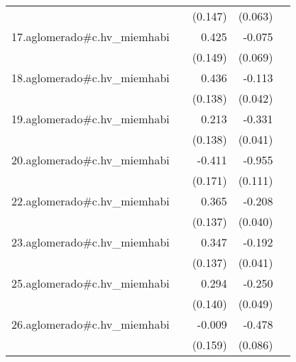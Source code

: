 {\begin{longtable}{l*{4}{D{.}{.}{-1}}}
            &                     &     (0.147)         &     (0.063)         &                     \\
\addlinespace
17.aglomerado#c.hv\_miemhabi&                     &       0.425\sym{**} &      -0.075         &                     \\
            &                     &     (0.149)         &     (0.069)         &                     \\
\addlinespace
18.aglomerado#c.hv\_miemhabi&                     &       0.436\sym{**} &      -0.113\sym{**} &                     \\
            &                     &     (0.138)         &     (0.042)         &                     \\
\addlinespace
19.aglomerado#c.hv\_miemhabi&                     &       0.213         &      -0.331\sym{***}&                     \\
            &                     &     (0.138)         &     (0.041)         &                     \\
\addlinespace
20.aglomerado#c.hv\_miemhabi&                     &      -0.411\sym{*}  &      -0.955\sym{***}&                     \\
            &                     &     (0.171)         &     (0.111)         &                     \\
\addlinespace
22.aglomerado#c.hv\_miemhabi&                     &       0.365\sym{**} &      -0.208\sym{***}&                     \\
            &                     &     (0.137)         &     (0.040)         &                     \\
\addlinespace
23.aglomerado#c.hv\_miemhabi&                     &       0.347\sym{*}  &      -0.192\sym{***}&                     \\
            &                     &     (0.137)         &     (0.041)         &                     \\
\addlinespace
25.aglomerado#c.hv\_miemhabi&                     &       0.294\sym{*}  &      -0.250\sym{***}&                     \\
            &                     &     (0.140)         &     (0.049)         &                     \\
\addlinespace
26.aglomerado#c.hv\_miemhabi&                     &      -0.009         &      -0.478\sym{***}&                     \\
            &                     &     (0.159)         &     (0.086)         &                     \\

\end{longtable}}
